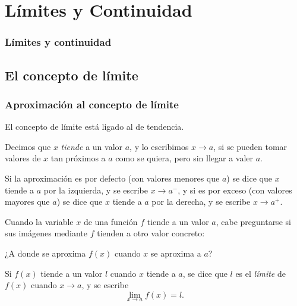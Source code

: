 
\section{Límites y Continuidad}

\begin{frame}
\frametitle{Límites y continuidad}
\tableofcontents[sectionstyle=show/hide,hideothersubsections]
\end{frame}



\subsection{El concepto de límite}
\begin{frame}
\frametitle{Aproximación al concepto de límite}
El concepto de límite está ligado al de tendencia.

Decimos que $x$ \emph{tiende} a un valor $a$, y lo escribimos $x\rightarrow a$, si se pueden tomar valores de $x$ tan próximos a $a$ como se quiera, pero sin llegar a valer $a$.

Si la aproximación es por defecto (con valores menores que $a$) se dice que $x$ tiende a $a$ por la izquierda, y se escribe $x\rightarrow a^-$, y si es por exceso (con valores mayores que $a$) se dice que $x$ tiende a $a$ por la derecha, y se escribe $x\rightarrow a^+$.

Cuando la variable $x$ de una función $f$ tiende a un valor $a$, cabe preguntarse si sus imágenes mediante $f$ tienden a otro valor concreto:
\begin{center}
\alert{¿A donde se aproxima $f(x)$ cuando $x$ se aproxima a $a$?}
\end{center}

Si $f(x)$ tiende a un valor $l$ cuando $x$ tiende a $a$, se dice que $l$ es el \emph{límite} de $f(x)$ cuando $x\rightarrow a$, y se escribe
\[\lim_{x\rightarrow a}f(x)=l.\]
\end{frame}



